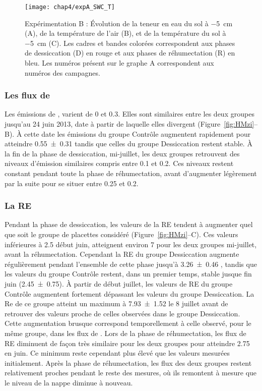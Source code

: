 \begin{figure}
\centering
\texttt{[image: chap4/expA\_SWC\_T]}
\caption{Expérimentation B : Évolution de la teneur en eau du sol à \SI{-5}{\centi\metre} (A), de la température de l'air (B), et de la température du sol à \SI{-5}{\centi\metre} (C). Les cadres et bandes colorées correspondent aux phases de dessiccation (D) en rouge et aux phases de réhumectation (R) en bleu. Les numéros présent sur le graphe A correspondent aux numéros des campagnes.}
\label{fig:HMzi_T}
\end{figure}

\subsubsection{Les flux de \chh}

Les émissions de \chh, varient de 0 et \SI{0.3}{\uml}.
Elles sont similaires entre les deux groupes jusqu'au 24 juin 2013, date à partir de laquelle elles divergent (Figure~\ref{fig:HMzi}--B).
À cette date les émissions du groupe Contrôle augmentent rapidement pour atteindre \SI{0.55(031)}{\uml} tandis que celles du groupe Dessiccation restent stable.
À la fin de la phase de dessiccation, mi-juillet, les deux groupes retrouvent des niveaux d'émission similaires compris entre \num{0.1} et \SI{0.2}{\uml}.
Ces niveaux restent constant pendant toute la phase de réhumectation, avant d'augmenter légèrement par la suite pour se situer entre \SI{0.25}{\uml} et \SI{0.2}{\uml}.

\subsubsection{La RE}

Pendant la phase de dessiccation, les valeurs de la RE tendent à augmenter quel que soit le groupe de placettes considéré (Figure~\ref{fig:HMzi}--C).
Ces valeurs inférieures à \SI{2.5}{\uml} début juin, atteignent environ \SI{7}{\uml} pour les deux groupes mi-juillet, avant la réhumectation.
Cependant la RE du groupe Dessiccation augmente régulièrement pendant l'ensemble de cette phase jusqu'à \SI{3.26(046)}{\uml} , tandis que les valeurs du groupe Contrôle restent, dans un premier temps, stable jusque fin juin (\SI{2.45(075)}{\uml}).
À partir de début juillet, les valeurs de RE du groupe Contrôle augmentent fortement dépassant les valeurs du groupe Dessiccation.
La Re de ce groupe atteint un maximum à \SI{7.93(152)}{\uml} le 8 juillet avant de retrouver des valeurs proche de celles observées dans le groupe Dessiccation.
Cette augmentation brusque correspond temporellement à celle observé, pour le même groupe, dans les flux de \chh.
Lors de la phase de réhumectation, les flux de RE diminuent de façon très similaire pour les deux groupes pour atteindre \SI{2.75}{\uml} en juin.
Ce minimum reste cependant plus élevé que les valeurs mesurées initialement.
Après la phase de réhumectation, les flux des deux groupes restent relativement proches pendant le reste des mesures, où ils remontent à mesure que le niveau de la nappe diminue à nouveau.

